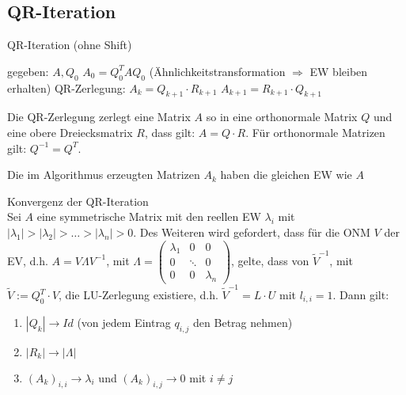 \subsection{QR-Iteration}
\begin{algorithm}
	\caption{QR-Iteration (ohne Shift)}
	\begin{algorithmic}
		\STATE gegeben: $A,Q_{0}$
		\STATE $A_{0}=Q_{0}^{T}AQ_{0}$ (Ähnlichkeitstransformation $\Rightarrow$ EW bleiben erhalten)
			\STATE QR-Zerlegung: $A_{k}=Q_{k+1}\cdot R_{k+1}$
			\STATE $A_{k+1}=R_{k+1}\cdot Q_{k+1}$
		\ENDFOR
	\end{algorithmic}
\end{algorithm}

\begin{remark}
	Die QR-Zerlegung zerlegt eine Matrix $A$ so in eine orthonormale Matrix $Q$ und eine obere Dreiecksmatrix $R$, dass gilt: $A=Q\cdot R$.
	Für orthonormale Matrizen gilt: $Q^{-1}=Q^{T}$.
\end{remark}

\begin{theorem}
[Satz II.2] Die im Algorithmus erzeugten Matrizen $A_{k}$ haben die gleichen EW wie $A$
\end{theorem}

\begin{theorem}
[Satz II.3] Konvergenz der QR-Iteration
\\
Sei $A$ eine symmetrische Matrix mit den reellen EW $\lambda_{i}$ mit $|\lambda_{1}|>|\lambda_{2}|>\ldots > |\lambda_{n}| > 0$.
Des Weiteren wird gefordert, dass für die ONM $V$ der EV, d.h. $A=V\Lambda V^{-1}$, mit $\Lambda=\left(
	\begin{array}{ccc}
		\lambda_{1} & 0 & 0\\
		0 &\ddots & 0 \\
		0 & 0 & \lambda_{n}
	\end{array}
	\right)$, gelte, dass von $\tilde V^{-1}$, mit $\tilde V:=Q_{0}^{T}\cdot V$, 
	die LU-Zerlegung existiere, d.h. $\tilde V^{-1}=L\cdot U$ mit $l_{i,i}=1$.
	Dann gilt:
	\begin{enumerate}
		\item $|Q_{k}|\rightarrow Id$ (von jedem Eintrag $q_{i,j}$ den Betrag nehmen)
		\item $|R_{k}|\rightarrow |\Lambda|$
		\item $(A_{k})_{i,i}\rightarrow \lambda_{i}$ und $(A_{k})_{i,j} \rightarrow 0$ mit $i \not = j$
	\end{enumerate}
\end{theorem}
